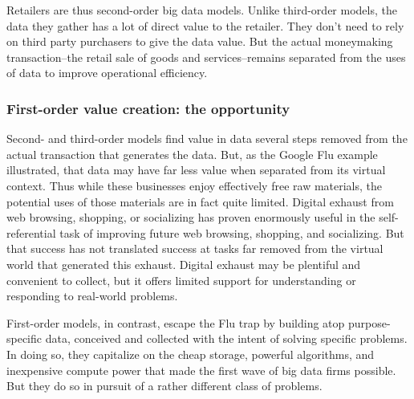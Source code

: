\documentclass[12pt]{article}
\begin{document}
Retailers are thus second-order big data models. Unlike third-order
models, the data they gather has a lot of direct value to the
retailer. They don't need to rely on third party purchasers to give
the data value. But the actual moneymaking transaction--the retail
sale of goods and services--remains separated from the uses of data to
improve operational efficiency. 



\subsubsection{First-order value creation: the opportunity}
\label{sec:first-order-value}

Second- and third-order models find value in data
several steps removed from the actual transaction that generates the
data. But, as the Google Flu example illustrated, that data may have
far less value when separated from its virtual context. Thus while
these businesses enjoy effectively free raw materials, the potential
uses of those materials are in fact quite limited. Digital exhaust
from web browsing, shopping, or socializing has proven enormously
useful in the self-referential task of improving future web browsing, shopping, and
socializing. But that success has not translated success at tasks far
removed from the virtual world that generated this exhaust. Digital
exhaust may be plentiful and convenient to collect, but it offers
limited support for understanding or responding to real-world problems.

First-order models, in contrast, escape the Flu trap by building atop
purpose-specific data, conceived and collected with the
intent of solving specific problems. In doing so, they capitalize
on the cheap storage, powerful algorithms, and inexpensive compute
power that made the first wave of big data firms possible. But they do
so in pursuit of a rather different class of problems.
\end{document}
